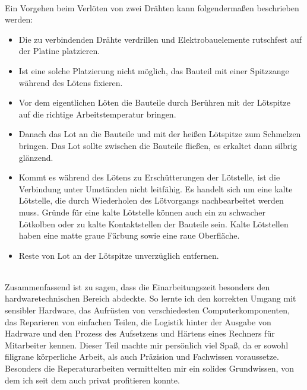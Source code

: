 \\
 Ein Vorgehen beim Verlöten von zwei Drähten kann folgendermaßen beschrieben werden:
\\
\begin{itemize}
	\item Die zu verbindenden Drähte verdrillen und Elektrobauelemente rutschfest auf der Platine platzieren.
	\item Ist eine solche Platzierung nicht möglich, das Bauteil mit einer Spitzzange während des Lötens fixieren.
	\item Vor dem eigentlichen Löten die Bauteile durch Berühren mit der Lötspitze auf die richtige Arbeitstemperatur bringen.
	\item Danach das Lot an die Bauteile und mit der heißen Lötspitze zum Schmelzen bringen. Das Lot sollte zwischen die Bauteile fließen, es erkaltet dann silbrig glänzend.
	\item Kommt es während des Lötens zu Erschütterungen der Lötstelle, ist die Verbindung unter Umständen nicht leitfähig. Es handelt sich um eine kalte Lötstelle, die durch Wiederholen des 		Lötvorgangs nachbearbeitet werden muss. Gründe für eine kalte Lötstelle können auch ein zu schwacher Lötkolben oder zu kalte Kontaktstellen der Bauteile sein. Kalte Lötstellen haben 			eine matte graue Färbung sowie eine raue Oberfläche.
	\item Reste von Lot an der Lötspitze unverzüglich entfernen.
\end{itemize}
\
\\
Zusammenfassend ist zu sagen, dass die Einarbeitungszeit besonders den hardwaretechnischen Bereich abdeckte. So lernte ich den korrekten Umgang mit sensibler Hardware, das Aufrüsten von verschiedesten Computerkomponenten, das Reparieren von einfachen Teilen, die Logistik hinter der Ausgabe von Hadrware und den Prozess des Aufsetzens und Härtens eines Rechners für Mitarbeiter kennen. Dieser Teil machte mir persönlich viel Spaß, da er sowohl filigrane körperliche Arbeit, als auch Präzision und Fachwissen voraussetze. Besonders die Reperaturarbeiten vermittelten mir ein solides Grundwissen, von dem ich seit dem auch privat profitieren konnte.